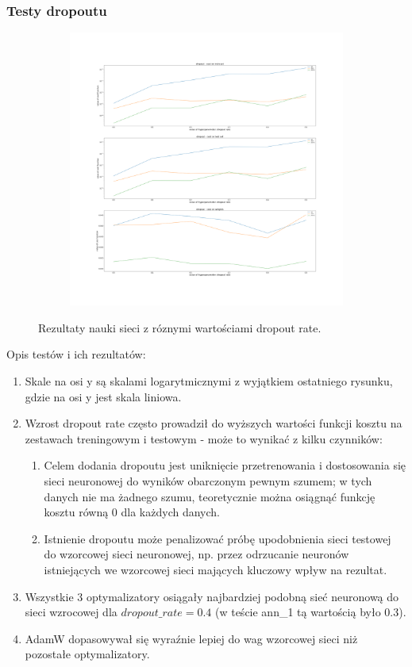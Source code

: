 \documentclass[12pt]{article}
\begin{document}
\subsubsection{Testy dropoutu}
\begin{figure}[H]
	\centering
	\begin{subfigure}[b]{1\linewidth}
		\includegraphics[width=\linewidth]{Comparision_dropout_ann_0.png}
	\end{subfigure}
	\caption{Rezultaty nauki sieci z róznymi wartościami dropout rate.}
	\label{fig:dropout}
\end{figure}
Opis testów i ich rezultatów:
\begin{enumerate}
	\item Skale na osi y są skalami logarytmicznymi z wyjątkiem ostatniego rysunku, gdzie na osi y jest skala liniowa.
	\item Wzrost dropout rate często prowadził do wyższych wartości funkcji kosztu na zestawach treningowym i testowym - może to wynikać z kilku czynników:
	\begin{enumerate}
		\item Celem dodania dropoutu jest uniknięcie przetrenowania i dostosowania się sieci neuronowej do wyników obarczonym pewnym szumem; w tych danych nie ma żadnego szumu, teoretycznie można osiągnąć funkcję kosztu równą 0 dla każdych danych.
		\item Istnienie dropoutu może penalizować próbę upodobnienia sieci testowej do wzorcowej sieci neuronowej, np. przez odrzucanie neuronów istniejących we wzorcowej sieci mających kluczowy wpływ na rezultat.
	\end{enumerate}
	\item Wszystkie 3 optymalizatory osiągały najbardziej podobną sieć neuronową do sieci wzrocowej dla $dropout\_rate=0.4$ (w teście ann\_1 tą wartością było 0.3).
	\item AdamW dopasowywał się wyraźnie lepiej do wag wzorcowej sieci niż pozostałe optymalizatory.
\end{enumerate}
\end{document}
